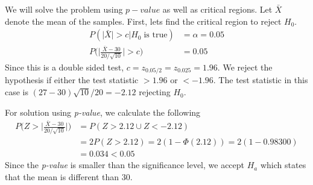 \documentclass[../../probability-notes.tex]{subfiles}
\begin{document}
    We will solve the problem using $p-value$ as well as critical regions. Let $\bar{X}$ denote the mean of the samples. First, lets find the critical region to reject $H_{0}$.
    \begin{align*}
        P(\lvert \bar{X} \rvert > c \lvert H_{0} \;\text{is true}) &= \alpha = 0.05\\
        P \bigg(\bigg\lvert \frac{\bar{X} - 30}{20/\sqrt{10}} \bigg\rvert > c \bigg) &= 0.05
    \end{align*}
    Since this is a double sided test, $c = z_{0.05/2} = z_{0.025} = 1.96$. We reject the hypothesis if either the test statistic $> 1.96$ or $< -1.96$. The test statistic in this case is $(27-30) \sqrt{10} / 20 = -2.12$ rejecting $H_{0}$.\newline

    For solution using \emph{p-value}, we calculate the following
    \begin{align*}
        P \bigg(Z > \bigg\lvert \frac{\bar{X} - 30}{20/\sqrt{10}} \bigg\rvert \bigg) &= P(Z > 2.12 \cup Z < -2.12)\\
        &= 2P(Z > 2.12) = 2(1-\Phi(2.12)) = 2(1-0.98300)\\
        &= 0.034 < 0.05
    \end{align*}
    Since the \emph{p-value} is smaller than the significance level, we accept $H_{a}$ which states that the mean is different than $30$.
\end{document}
